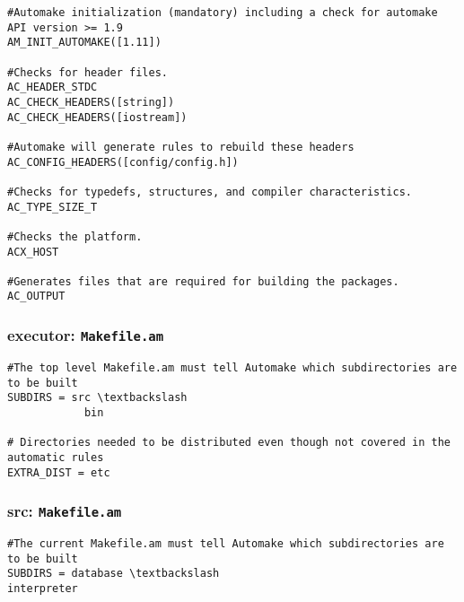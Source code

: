 \begin{minipage}{.5\paperwidth}
\begin{mylisting}
\begin{Verbatim}[commandchars=\\\{\},fontsize=\scriptsize, numbersep=2pt]
#Automake initialization (mandatory) including a check for automake API version >= 1.9
AM_INIT_AUTOMAKE([1.11])

#Checks for header files.
AC_HEADER_STDC
AC_CHECK_HEADERS([string])
AC_CHECK_HEADERS([iostream])

#Automake will generate rules to rebuild these headers
AC_CONFIG_HEADERS([config/config.h])

#Checks for typedefs, structures, and compiler characteristics.
AC_TYPE_SIZE_T

#Checks the platform.
ACX_HOST

#Generates files that are required for building the packages.
AC_OUTPUT
\end{Verbatim}
\end{mylisting}
\end{minipage}

\subsubsection{executor: \texttt{Makefile.am}}

\begin{minipage}{.5\paperwidth}
\begin{mylisting}
\begin{Verbatim}[commandchars=\\\{\},fontsize=\scriptsize, numbersep=2pt]
#The top level Makefile.am must tell Automake which subdirectories are to be built
SUBDIRS = src \textbackslash
            bin

# Directories needed to be distributed even though not covered in the automatic rules
EXTRA_DIST = etc
\end{Verbatim}
\end{mylisting}
\end{minipage}
\subsubsection{src: \texttt{Makefile.am}}

\begin{minipage}{.5\paperwidth}
\begin{mylisting}
\begin{Verbatim}[commandchars=\\\{\},fontsize=\scriptsize, numbersep=2pt]
#The current Makefile.am must tell Automake which subdirectories are to be built
SUBDIRS = database \textbackslash
interpreter
\end{Verbatim}
\end{mylisting}
\end{minipage}
